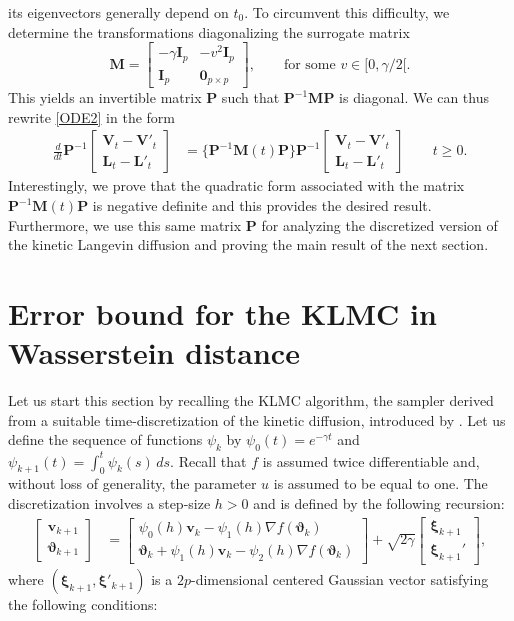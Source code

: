 \documentclass[a4paper,bej,preprint,reqno]{imsart}
\newcommand\bfP{\mathbf P}
\newcommand\bfM{\mathbf M}
\newcommand\bL{\boldsymbol L}
\newcommand\bV{\boldsymbol V}
\newcommand\bv{\boldsymbol v}
\newcommand\bxi{\boldsymbol \xi}
\newcommand\bfI{\mathbf I}
\newcommand\bvartheta{\boldsymbol\vartheta}
\begin{document}
its eigenvectors generally depend on $t_0$. To circumvent this difficulty, we
determine the transformations diagonalizing the surrogate matrix
$$
\bfM = 		\begin{bmatrix}
		-\gamma\bfI_p  & -v^2\bfI_p \\
		\bfI_p & \mathbf 0_{p\times p}
		\end{bmatrix}, \qquad\text{for some $v\in[0,\gamma/2[$}.
$$
This yields an invertible  matrix $\bfP$ such that $\bfP^{-1}\bfM\bfP$ is diagonal.
We can thus rewrite \eqref{ODE2} in the form
\begin{align}\label{ODE3}
    \frac{d}{dt}
		\bfP^{-1}\begin{bmatrix}
		\bV_t-\bV'_t\\
		\bL_t-\bL'_t
		\end{bmatrix}
		&= \{\bfP^{-1}\bfM(t)\bfP\}\bfP^{-1}
		\begin{bmatrix}
		\bV_t-\bV'_t\\
		\bL_t-\bL'_t
		\end{bmatrix}
		\qquad t\ge 0.
\end{align}
Interestingly, we prove that the quadratic form associated with
the  matrix $\bfP^{-1}\bfM(t)\bfP$ is negative definite and this provides the desired
result. Furthermore, we use this same matrix $\bfP$ for analyzing the discretized
version of the kinetic Langevin diffusion and proving the main result of the next section.



\section{Error bound for the KLMC in Wasserstein distance} \label{sec:KLMC}

Let us start this section by recalling the KLMC algorithm, the sampler
derived from  a suitable time-discretization of the kinetic diffusion,
introduced by \cite{Cheng2}. Let us define the sequence of functions $\psi_k$ by
$\psi_0(t) = e^{-\gamma t}$ and $\psi_{k+1} (t)= \int_0^t \psi_k(s)\,ds$.
Recall that $f$ is assumed twice differentiable and,
without loss of generality, the parameter $u$ is assumed to be equal to one.
The discretization involves a step-size $h>0$ and is defined by the following
recursion:
\begin{align}\label{KLMC}
\begin{bmatrix}
	\bv_{k+1}\\[4pt]
	\bvartheta_{k+1}
\end{bmatrix}
&=
\begin{bmatrix}
	\psi_0(h)\bv_k-\psi_1(h)\nabla f(\bvartheta_k)\\[4pt]
	\bvartheta_{k} + \psi_1(h)\bv_k -\psi_2(h)\nabla f(\bvartheta_k)
\end{bmatrix}
+ \sqrt{2\gamma }
\begin{bmatrix}
	\bxi_{k+1}\\[4pt]
	\bxi_{k+1}'
\end{bmatrix},	
\end{align}
where $(\bxi_{k+1},\bxi'_{k+1})$ is a $2p$-dimensional centered Gaussian vector
satisfying the following conditions:
\vspace{-18pt}
\end{document}
